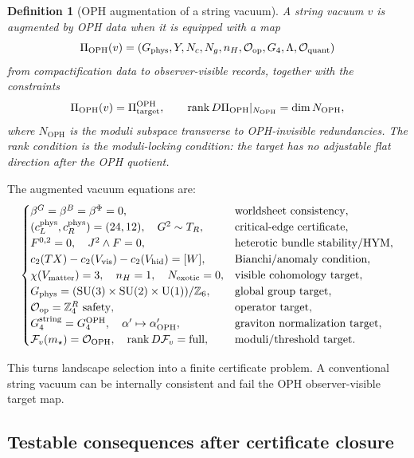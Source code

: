 \documentclass[11pt]{article}
\newtheorem{definition}[theorem]{Definition}
\theoremstyle{remark}
\theoremstyle{plain}
\newcommand{\OPH}{\mathrm{OPH}}
\newcommand{\SU}{\mathrm{SU}}
\newcommand{\U}{\mathrm{U}}
\newcommand{\Z}{\mathbb Z}
\newcommand{\calF}{\mathcal F}
\newcommand{\calO}{\mathcal O}
\newcommand{\ZfourR}{\mathbb Z_4^R}
\begin{document}
\begin{definition}[OPH augmentation of a string vacuum]
A string vacuum \(v\) is augmented by OPH data when it is equipped with a map
\[
\Pi_{\OPH}(v)=
\left(
G_{\rm phys},Y,N_c,N_g,n_H,\calO_{\rm op},G_4,\Lambda,\calO_{\rm quant}
\right)
\]
from compactification data to observer-visible records, together with the constraints
\[
\Pi_{\OPH}(v)=\Pi_{\rm target}^{\OPH},
\qquad
\operatorname{rank}D\Pi_{\OPH}|_{N_{\OPH}}=\dim N_{\OPH},
\]
where \(N_{\OPH}\) is the moduli subspace transverse to OPH-invisible redundancies. The rank
condition is the moduli-locking condition: the target has no adjustable flat direction after the
OPH quotient.
\end{definition}

The augmented vacuum equations are:
\[
\begin{cases}
\beta^G=\beta^B=\beta^\Phi=0, & \text{worldsheet consistency},\\
(c_L^{\rm phys},c_R^{\rm phys})=(24,12),\quad G^2\sim T_R, &
\text{critical-edge certificate},\\
F^{0,2}=0,\quad J^2\wedge F=0, & \text{heterotic bundle stability/HYM},\\
c_2(TX)-c_2(V_{\rm vis})-c_2(V_{\rm hid})=[W], & \text{Bianchi/anomaly condition},\\
\chi(V_{\rm matter})=3,\quad n_H=1,\quad N_{\rm exotic}=0, & \text{visible cohomology target},\\
G_{\rm phys}=(\SU(3)\times\SU(2)\times\U(1))/\Z_6, & \text{global group target},\\
\calO_{\rm op}=\ZfourR\text{ safety}, & \text{operator target},\\
G_4^{\rm string}=G_4^{\OPH},\quad \alpha'\mapsto\alpha'_{\OPH}, & \text{graviton normalization target},\\
\calF_v(m_\star)=\calO_{\OPH},\quad \operatorname{rank}D\calF_v=\mathrm{full}, & \text{moduli/threshold target}.
\end{cases}
\]

This turns landscape selection into a finite certificate problem. A conventional string vacuum can
be internally consistent and fail the OPH observer-visible target map.

\subsection{Testable consequences after certificate closure}
\end{document}
